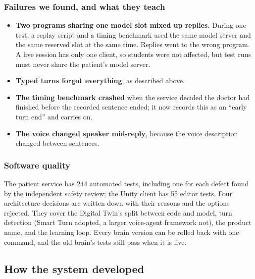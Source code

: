 \documentclass[journal]{IEEEtran}
\begin{document}
\subsubsection{Failures we found, and what they teach}
\begin{itemize}
\item \textbf{Two programs sharing one model slot mixed up replies.} During one test, a replay script and a timing benchmark used the same model server and the same reserved slot at the same time. Replies went to the wrong program. A live session has only one client, so students were
not affected, but test runs must never share the patient's model server.
\item \textbf{Typed turns forgot everything}, as described above.
\item \textbf{The timing benchmark crashed} when the service decided the doctor had finished before the recorded sentence ended; it now records
this as an ``early turn end'' and carries on.
\item \textbf{The voice changed speaker mid-reply}, because the voice description changed between sentences.
\end{itemize}

\subsubsection{Software quality}
The patient service has 244 automated tests, including one for each defect found by the independent safety review; the Unity client has 55
editor tests. Four architecture decisions are written down with their reasons and the options rejected. They cover the Digital Twin's split between code and model, turn detection (Smart Turn adopted, a larger voice-agent framework not), the product name, and the learning loop. Every brain version can be rolled back with one command, and the old brain's tests still pass when it is
live.


\subsection{How the system developed}
\end{document}
